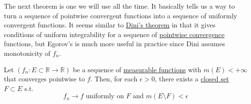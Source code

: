   The next theorem is one we will use all the time. It basically tells us a way to turn a sequence of pointwise convergent functions into a sequence of uniformly convergent functions. It seems similar to \hyperref[real-thm:dini]{Dini's theorem} in that it gives conditions of uniform integrability for a sequence of \hyperref[real-def:pointwise-convergence]{pointwise convergence} functions, but Egorov's is much more useful in practice since Dini assumes monotonicity of $f_n$. 

  \begin{theorem}[Egorov]
    \label{thm:egorov-2}
    Let $(f_n: E \subset \mathbb{R} \to \mathbb{R})$ be a sequence of \hyperref[def:measurable-function]{measurable functions} with $m(E) < +\infty$ that converges pointwise to $f$. Then, for each $\epsilon > 0$, there exists a \hyperref[pst-def:closed]{closed set} $F \subset E$  s.t. 
    \begin{equation}
      f_n \to f \text{ uniformly on } F \text{ and } m(E \setminus F) < \epsilon
    \end{equation}
  \end{theorem}
